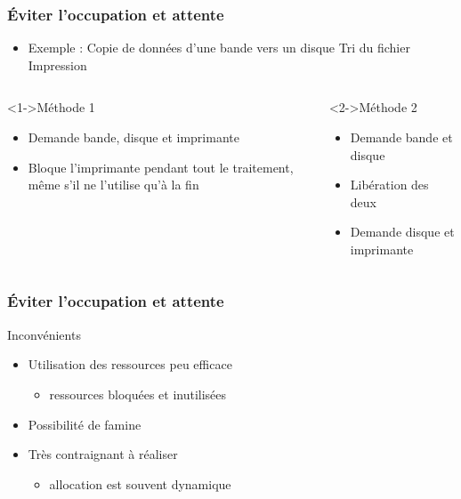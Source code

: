\begin{frame}
\frametitle{Éviter l’occupation et attente}
\begin{itemize}
\item Exemple :
Copie de données d’une bande vers un disque
Tri du fichier
Impression
\end{itemize}
\begin{columns}
\begin{block}<1->{Méthode 1}
\begin{itemize}
\item Demande bande, disque et imprimante
\item Bloque l’imprimante pendant tout le traitement, même s’il ne l’utilise qu’à la fin
\end{itemize}
\end{block}
\begin{block}<2->{Méthode 2}
\begin{itemize}
\item Demande bande et disque
\item Libération des deux
\item Demande disque et imprimante
\end{itemize}
\end{block}
\end{columns}
\end{frame}

\begin{frame}
\frametitle{Éviter l’occupation et attente}
\begin{block}{Inconvénients}
\begin{itemize}
\item Utilisation des ressources peu efficace
\begin{itemize}
\item ressources bloquées et inutilisées
\end{itemize}
\item Possibilité de famine
\item Très contraignant à réaliser
\begin{itemize}
\item allocation est souvent dynamique
\end{itemize}
\end{itemize}
\end{block}
\end{frame}

